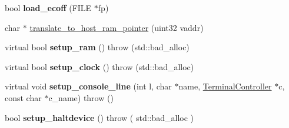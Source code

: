 \begin{DoxyCompactItemize}
\item 
\hypertarget{classvmips_a4476a0bc2039e7a43ec2208d7ae5addb}{
bool {\bfseries load\_\-ecoff} (FILE $\ast$fp)}
\label{classvmips_a4476a0bc2039e7a43ec2208d7ae5addb}

\item 
char $\ast$ \hyperlink{classvmips_aca7c30f28c9be1cbf9d0780d66d3393c}{translate\_\-to\_\-host\_\-ram\_\-pointer} (uint32 vaddr)
\item 
\hypertarget{classvmips_a8374e36944913b2a41f9a72bef18f691}{
virtual bool {\bfseries setup\_\-ram} ()  throw (std::bad\_\-alloc)}
\label{classvmips_a8374e36944913b2a41f9a72bef18f691}

\item 
\hypertarget{classvmips_a2ede92940f80c240d6550987d280a39b}{
virtual bool {\bfseries setup\_\-clock} ()  throw (std::bad\_\-alloc)}
\label{classvmips_a2ede92940f80c240d6550987d280a39b}

\item 
\hypertarget{classvmips_a441e17463fe05a71a960e1f98f11019b}{
virtual void {\bfseries setup\_\-console\_\-line} (int l, char $\ast$name, \hyperlink{classTerminalController}{TerminalController} $\ast$c, const char $\ast$c\_\-name)  throw ()}
\label{classvmips_a441e17463fe05a71a960e1f98f11019b}

\item 
\hypertarget{classvmips_ace907fda17fe54e632f871ba19405744}{
bool {\bfseries setup\_\-haltdevice} ()  throw ( std::bad\_\-alloc )}
\label{classvmips_ace907fda17fe54e632f871ba19405744}

\end{DoxyCompactItemize}
